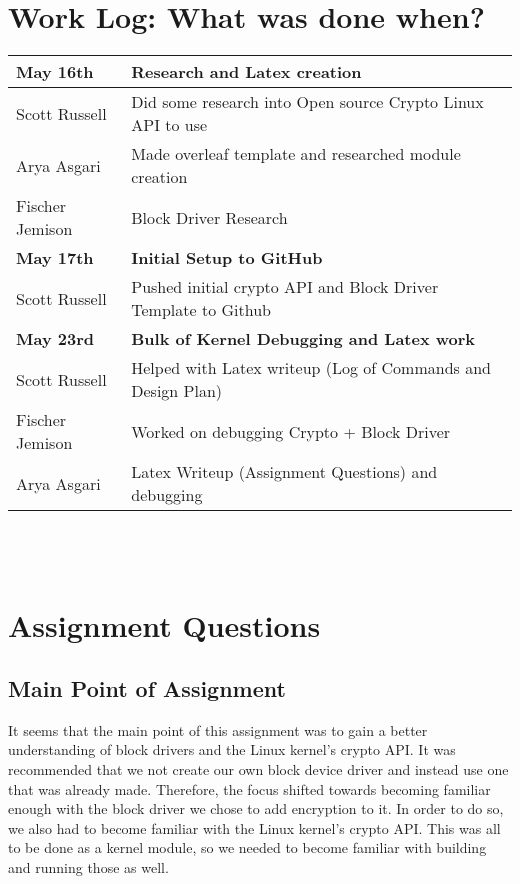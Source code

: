 \documentclass[onecolumn, draftclsnofoot,10pt, compsoc]{IEEEtran}
\begin{document}
\section{Work Log: What was done when?}
\begin{tabular} {| p{2.5cm} | p{8.4cm}|}

\hline
\textbf{May 16th} & \textbf{Research and Latex creation} \\
\hline 
Scott Russell & Did some research into Open source Crypto Linux API to use \\
\hline 
Arya Asgari & Made overleaf template and researched module creation \\

\hline 
Fischer Jemison & Block Driver Research \\
\hline
\textbf{May 17th} & \textbf{Initial Setup to GitHub} \\
\hline 
Scott Russell & Pushed initial crypto API and Block Driver Template to Github\\
\hline
\textbf{May 23rd} & \textbf{Bulk of Kernel Debugging and Latex work} \\
\hline 
Scott Russell & Helped with Latex writeup (Log of Commands and Design Plan) \\
\hline
Fischer Jemison & Worked on debugging Crypto + Block Driver\\
\hline
Arya Asgari & Latex Writeup (Assignment Questions) and debugging\\
\hline
\end {tabular}
\\ \\

\section{Assignment Questions}
\subsection{Main Point of Assignment}
It seems that the main point of this assignment was to gain a better understanding of block drivers and the Linux kernel's crypto API. It was recommended that we not create our own block device driver and instead use one that was already made. Therefore, the focus shifted towards becoming familiar enough with the block driver we chose to add encryption to it. In order to do so, we also had to become familiar with the Linux kernel's crypto API. This was all to be done as a kernel module, so we needed to become familiar with building and running those as well. 
\end{document}
